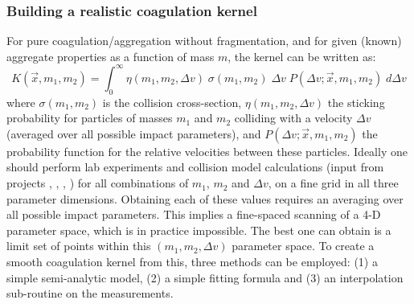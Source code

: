 \subsubsection{Building a realistic coagulation kernel}
For pure coagulation/aggregation without fragmentation, and for given
(known) aggregate properties as a function of mass $m$, the kernel can be
written as:
\begin{equation}\label{eq-kernel-1}
K(\vec x, m_1, m_2) = \int_0^\infty \eta(m_1,m_2,\Delta v)\;
\sigma(m_1,m_2)\; \Delta v\; P(\Delta v;\vec x,m_1,m_2)\; d \Delta v
\end{equation}
where $\sigma(m_1,m_2)$ is the collision cross-section, $\eta(m_1,m_2,\Delta
v)$ the sticking probability for particles of masses $m_1$ and $m_2$
colliding with a velocity $\Delta v$ (averaged over all possible impact
parameters), and $P(\Delta v;\vec x,m_1,m_2)$ the probability function for
the relative velocities between these particles.  Ideally one should perform
lab experiments and collision model calculations (input from projects \projblum{},
\projwurm{}, \projblumtrie{}, \projkley{}) for all combinations of $m_1$,
$m_2$ and $\Delta v$, on a fine grid in all three parameter dimensions.
Obtaining each of these values requires an averaging over all possible
impact parameters. This implies a fine-spaced scanning of a 4-D parameter
space, which is in practice impossible. The best one can obtain is a limit
set of points within this $(m_1,m_2,\Delta v)$ parameter space. To create a
smooth coagulation kernel from this, three methods can be employed: (1) a
simple semi-analytic model, (2) a simple fitting formula and (3) an
interpolation sub-routine on the measurements.

